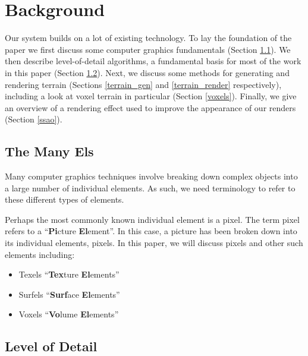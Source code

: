 \chapter{Background}


Our system builds on a lot of existing technology.
To lay the foundation of the paper we first discuss some computer graphics fundamentals (Section \ref{els}).
We then describe level-of-detail algorithms, a fundamental basis for most of the work in this paper (Section \ref{lod}).
Next, we discuss some methods for generating and rendering terrain (Sections \ref{terrain_gen} and \ref{terrain_render} respectively), including a look at voxel terrain in particular (Section \ref{voxels}).
Finally, we give an overview of a rendering effect used to improve the appearance of our renders (Section \ref{ssao}).



\section{The Many Els} \label{els}

Many computer graphics techniques involve breaking down complex objects into a large number of individual elements.
As such, we need terminology to refer to these different types of elements.

Perhaps the most commonly known individual element is a pixel.
The term pixel refers to a ``\textbf{Pi}cture \textbf{El}ement''.
In this case, a picture has been broken down into its individual elements, pixels.
In this paper, we will discuss pixels and other such elements including:

\begin{itemize}
	\item Texels ``\textbf{Tex}ture \textbf{El}ements''
	\item Surfels ``\textbf{Surf}ace \textbf{El}ements''
	\item Voxels ``\textbf{Vo}lume \textbf{El}ements''
\end{itemize}


\section{Level of Detail} \label{lod}


